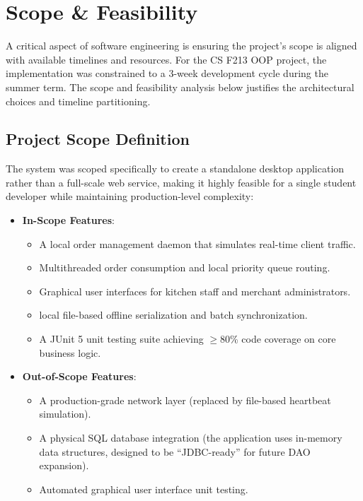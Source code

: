 
\section{Scope \& Feasibility}
\label{sec:scope_feasibility}

A critical aspect of software engineering is ensuring the project's scope is aligned with available timelines and resources. For the CS F213 OOP project, the implementation was constrained to a 3-week development cycle during the summer term. The scope and feasibility analysis below justifies the architectural choices and timeline partitioning.

\subsection{Project Scope Definition}
The system was scoped specifically to create a standalone desktop application rather than a full-scale web service, making it highly feasible for a single student developer while maintaining production-level complexity:
\begin{itemize}
    \item \textbf{In-Scope Features}:
    \begin{itemize}
        \item A local order management daemon that simulates real-time client traffic.
        \item Multithreaded order consumption and local priority queue routing.
        \item Graphical user interfaces for kitchen staff and merchant administrators.
        \item local file-based offline serialization and batch synchronization.
        \item A JUnit 5 unit testing suite achieving $\ge$80\% code coverage on core business logic.
    \end{itemize}
    \item \textbf{Out-of-Scope Features}:
    \begin{itemize}
        \item A production-grade network layer (replaced by file-based heartbeat simulation).
        \item A physical SQL database integration (the application uses in-memory data structures, designed to be ``JDBC-ready'' for future DAO expansion).
        \item Automated graphical user interface unit testing.
    \end{itemize}
\end{itemize}


